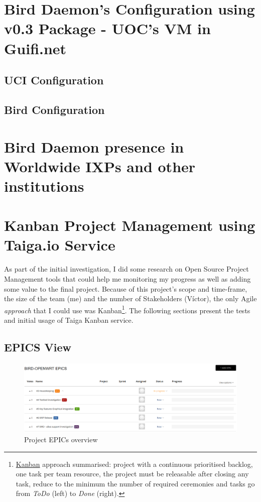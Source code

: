 \newpage
\begin{appendices}

\chapter{Bird Daemon's Configuration using v0.3 Package - UOC's VM in Guifi.net}
\label{app:ch:bdcuoc}

\section{UCI Configuration}


\section{Bird Configuration}



\chapter{Bird Daemon presence in Worldwide IXPs and other institutions}
\label{app:ch:blinks}

\chapter{Kanban Project Management using Taiga.io Service}
\label{app:sec:kanban}
As part of the initial investigation, I did some research on Open Source Project Management tools that could help me monitoring my progress as well as adding some value to the final project.
Because of this project's scope and time-frame, the size of the team (me) and the number of Stakeholders (Víctor), the only Agile \textit{approach} that I could use was Kanban\footnote{\href{http://www.scrumhub.com/kanban-fundamentals/}{Kanban} approach summarised: project with a continuous prioritised backlog, one task per team resource, the project must be releasable after closing any task, reduce to the minimum the number of required ceremonies and tasks go from \textit{ToDo} (left) to \textit{Done} (right).}. The following sections present the tests and initial usage of Taiga Kanban service.

\begin{landscape}
\section{EPICS View}
\begin{figure}[h!]
\centering
    \includegraphics[width=\hsize]{images/kanban/epics}
    \caption{Project EPICs overview}
    \label{fig:kepic}
\end{figure}


\end{landscape}
\end{appendices}

